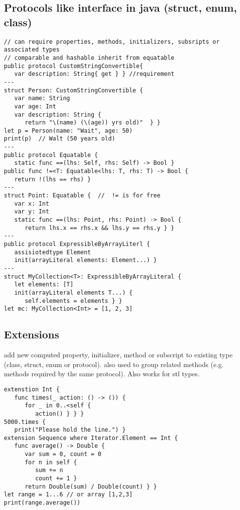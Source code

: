 \subsection{Protocols like interface in java (struct, enum, class)}
\begin{lstlisting}
// can require properties, methods, initializers, subsripts or associated types
// comparable and hashable inherit from equatable
public protocol CustomStringConvertible{
   var description: String{ get } } //requirement
---
struct Person: CustomStringConvertible {
   var name: String
   var age: Int
   var description: String {
      return "\(name) (\(age)) yrs old)"  } }
let p = Person(name: "Wait", age: 50)
print(p)  // Walt (50 years old)
---
public protocol Equatable {
   static func ==(lhs: Self, rhs: Self) -> Bool }
public func !=<T: Equatable<lhs: T, rhs: T) -> Bool {
   return !(lhs == rhs) }
---
struct Point: Equatable {  //  != is for free
   var x: Int
   var y: Int
   static func ==(lhs: Point, rhs: Point) -> Bool {
      return lhs.x == rhs.x && lhs.y == rhs.y } }
---
public protocol ExpressibleByArrayLiterl {
   assisiotedtype Element
   init(arrayLiteral elements: Element...) }
---
struct MyCollection<T>: ExpressibleByArrayLiteral {
   let elements: [T]
   init(arrayLiteral elements T...) {
      self.elements = elements } }
let mc: MyCollection<Int> = [1, 2, 3]
\end{lstlisting}

\subsection{Extensions}
add new computed property, initializer, method or subscript to existing type (class, struct, enum or protocol). also used to group related methods (e.g. methods required by the same protocol). Also works for stl types.
\begin{lstlisting}
extenstion Int {
   func times(_ action: () -> ()) {
      for _ in 0..<self {
         action() } } }
5000.times {
   print("Please hold the line.") }
extension Sequence where Iterator.Element == Int {
   func average() -> Double {
      var sum = 0, count = 0
      for n in self {
         sum += n
         count += 1 }
      return Double(sum) / Double(count) } }
let range = 1...6 // or array [1,2,3]
print(range.average())
\end{lstlisting}


